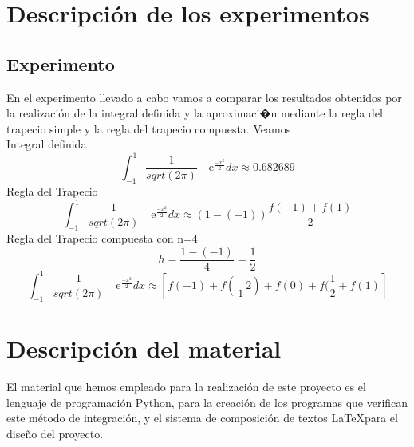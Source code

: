 
\section{Descripción de los experimentos}
\label{3:sec:1}
\parindent=1cm
\raggedright
\subsection{Experimento}
En el experimento llevado a cabo vamos a comparar los resultados obtenidos por la realización de la integral definida y la aproximaci�n
mediante la regla del trapecio simple y la regla del trapecio compuesta. Veamos\\
Integral definida 
\[
\int_{-1}^{1} \frac{1}{sqrt(2\pi)} \quad\text{e}^{\frac{-x^2}{2}}dx\approx0.682689 
\]
Regla del Trapecio
\[
\int_{-1}^{1} \frac{1}{sqrt(2\pi)} \quad\text{e}^{\frac{-x^2}{2}}dx\approx\left(1-(-1)\right)\frac{f(-1)+f(1)}{2}
\]
Regla del Trapecio compuesta con n=4
\[
h=\frac{1-(-1)}{4} =\frac{1}{2} 
\]
\[
\int_{-1}^{1} \frac{1}{sqrt(2\pi)} \quad\text{e}^{\frac{-x^2}{2}}dx\approx\left[f(-1) + f(\frac-{1}{2}) + f(0) + f(\frac{1}{2} + f(1)\right]
\]

\section{Descripción del material}
\label{3:sec:2}
\parindent=1cm
\raggedright
El material que hemos empleado para la realización de este proyecto es el lenguaje de
programación Python, para la creación de los programas que verifican este método de integración, 
y el sistema de composición de textos \LaTeX para el diseño del proyecto.

